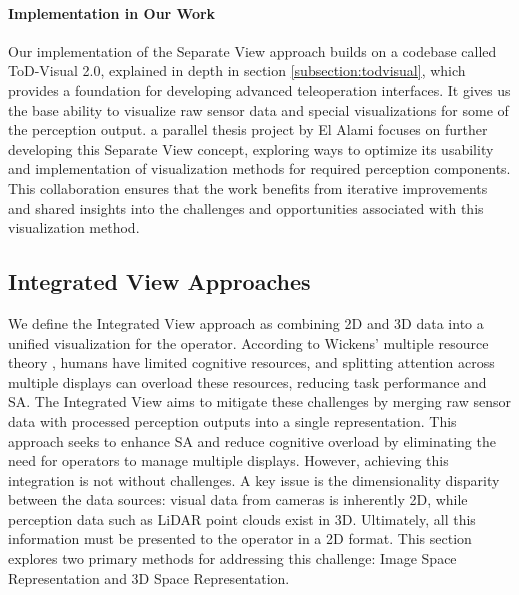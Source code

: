 \paragraph{Implementation in Our Work} Our implementation of the Separate View approach builds on a codebase called ToD-Visual 2.0, explained in depth in section \ref{subsection:todvisual}, which provides a foundation for developing advanced teleoperation interfaces.
It gives us the base ability to visualize raw sensor data and special visualizations for some of the perception output.
a parallel thesis project by El Alami \cite{yassinethesis} focuses on further developing this Separate View concept, exploring ways to optimize its usability and
implementation of visualization methods for required perception components. This collaboration ensures that the work benefits from iterative improvements and shared insights into the challenges and
opportunities associated with this visualization method.

\subsection{Integrated View Approaches}\label{section:integratedview}
We define the Integrated View approach as combining 2D and 3D data into a
unified visualization for the operator. According to Wickens' multiple resource theory \cite{wickens2008multiple},
humans have limited cognitive resources, and splitting attention across multiple displays can overload these resources,
reducing task performance and \ac{SA}. The Integrated View aims to mitigate these challenges by
merging raw sensor data with processed perception outputs into a single representation. This approach seeks to enhance
\ac{SA} and reduce cognitive overload by eliminating the need for operators to manage multiple displays.
However, achieving this integration is not without challenges. A key issue is the dimensionality disparity between the data sources:
visual data from cameras is inherently 2D, while perception data such as LiDAR point clouds exist in 3D.
Ultimately, all this information must be presented to the operator in a 2D format.
This section explores two primary methods for addressing this challenge:
Image Space Representation and 3D Space Representation.

